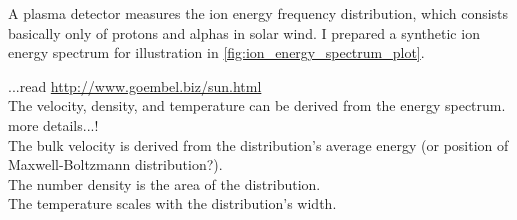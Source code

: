 A plasma detector measures the ion energy frequency distribution, which consists basically only of protons and alphas in solar wind. I prepared a synthetic ion energy spectrum for illustration in \autoref{fig:ion_energy_spectrum_plot}.\\
\begin{figure}[htb]
\end{figure}
...read \url{http://www.goembel.biz/sun.html}\\

The velocity, density, and temperature can be derived from the energy spectrum.\\
more details...!\\

The bulk velocity is derived from the distribution's average energy (or position of Maxwell-Boltzmann distribution?).\\
The number density is the area of the distribution.\\
The temperature scales with the distribution's width.\\


